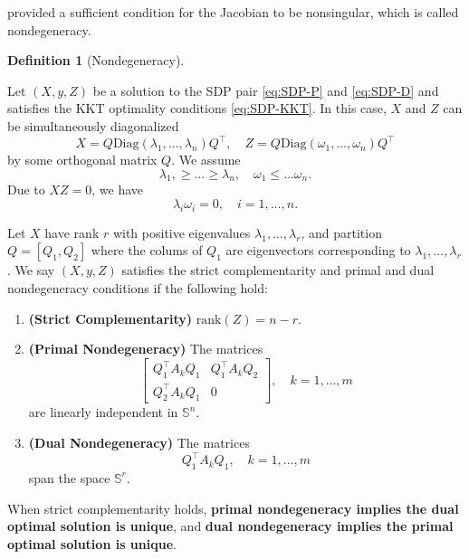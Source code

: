 \documentclass[
]{book}
\theoremstyle{definition}
\newtheorem{definition}{Definition}[chapter]
\theoremstyle{definition}
\theoremstyle{definition}
\theoremstyle{definition}
\theoremstyle{remark}
\begin{document}
\citep{alizadeh98siopt-primal} provided a sufficient condition for the Jacobian to be nonsingular, which is called nondegeneracy.

\begin{definition}[Nondegeneracy]
\protect\hypertarget{def:Nondegeneracy}{}\label{def:Nondegeneracy}

Let \((X,y,Z)\) be a solution to the SDP pair \eqref{eq:SDP-P} and \eqref{eq:SDP-D} and satisfies the KKT optimality conditions \eqref{eq:SDP-KKT}. In this case, \(X\) and \(Z\) can be simultaneously diagonalized
\[
X = Q \mathrm{Diag}(\lambda_1,\dots,\lambda_n) Q^\top, \quad Z = Q \mathrm{Diag}(\omega_1,\dots,\omega_n)Q^\top
\]
by some orthogonal matrix \(Q\). We assume
\[
\lambda_1, \geq \dots \geq \lambda_n, \quad \omega_1 \leq \dots \omega_n.
\]
Due to \(XZ = 0\), we have
\[
\lambda_i \omega_i = 0,\quad i=1,\dots,n.
\]

Let \(X\) have rank \(r\) with positive eigenvalues \(\lambda_1,\dots,\lambda_r\), and partition \(Q = [Q_1, Q_2]\) where the colums of \(Q_1\) are eigenvectors corresponding to \(\lambda_1,\dots,\lambda_r\). We say \((X,y,Z)\) satisfies the strict complementarity and primal and dual nondegeneracy conditions if the following hold:

\begin{enumerate}
\def\labelenumi{\arabic{enumi}.}
\item
  \textbf{(Strict Complementarity)} \(\mathrm{rank}(Z) = n - r\).
\item
  \textbf{(Primal Nondegeneracy)} The matrices
  \begin{equation}
  \begin{bmatrix} Q_1^\top A_k Q_1 & Q_1^\top A_k Q_2 \\
  Q_2^\top A_k Q_1 & 0 \end{bmatrix}, \quad k=1,\dots,m
  \label{eq:primal-nondegeneracy}
  \end{equation}
  are linearly independent in \(\mathbb{S}^{n}\).
\item
  \textbf{(Dual Nondegeneracy)} The matrices
  \begin{equation}
  Q_1^\top A_k Q_1, \quad k=1,\dots,m
  \label{eq:dual-nondegeneracy}
  \end{equation}
  span the space \(\mathbb{S}^{r}\).
\end{enumerate}

\end{definition}

When strict complementarity holds, \textbf{primal nondegeneracy implies the dual optimal solution is unique}, and \textbf{dual nondegeneracy implies the primal optimal solution is unique}.
\end{document}

